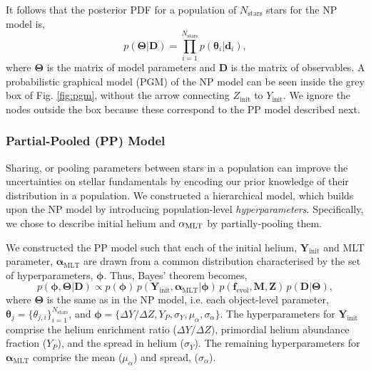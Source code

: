 It follows that the posterior PDF for a population of $N_\mathrm{stars}$ stars for the NP model is, 
%
\begin{equation}
    p(\boldsymbol{\Theta} | \boldsymbol{D}) = \prod_{i=1}^{N_{\mathrm{stars}}} p(\boldsymbol{\theta}_i | \boldsymbol{d}_i),   
\end{equation}
%
where $\boldsymbol{\Theta}$ is the matrix of model parameters and $\boldsymbol{D}$ is the matrix of observables. A probabilistic graphical model (PGM) of the NP model can be seen inside the grey box of Fig. \ref{fig:pgm}, without the arrow connecting $Z_\mathrm{init}$ to $Y_\mathrm{init}$. We ignore the nodes outside the box because these correspond to the PP model described next.

\subsubsection{Partial-Pooled (PP) Model}\label{sec:pp}



Sharing, or pooling parameters between stars in a population can improve the uncertainties on stellar fundamentals by encoding our prior knowledge of their distribution in a population. We constructed a hierarchical model, which builds upon the NP model by introducing population-level \emph{hyperparameters}. Specifically, we chose to describe initial helium and ${\alpha_\mathrm{MLT}}$ by partially-pooling them.

We constructed the PP model such that each of the initial helium, $\boldsymbol{Y}_\mathrm{init}$ and MLT parameter, $\boldsymbol{\alpha}_\mathrm{MLT}$ are drawn from a common distribution characterised by the set of hyperparameters, $\boldsymbol{\phi}$. Thus, Bayes' theorem becomes,
%
\begin{equation}
    p(\boldsymbol{\phi}, \boldsymbol{\Theta} | \boldsymbol{D}) \propto p(\boldsymbol{\phi}) \, p(\boldsymbol{Y}_\mathrm{init}, \boldsymbol{\alpha}_\mathrm{MLT} | \boldsymbol{\phi}) \, p(\boldsymbol{f}_{\mathrm{evol}}, \boldsymbol{M}, \boldsymbol{Z}) \, p(\boldsymbol{D} | \boldsymbol{\Theta}),
    \label{eq:hbmbayes}
\end{equation}
%
where $\boldsymbol{\Theta}$ is the same as in the NP model, i.e. each object-level parameter, $\boldsymbol{\theta}_j = \{\theta_{j, i}\}_{i=1}^{N_\mathrm{stars}}$, and $\boldsymbol{\phi} = \{\Delta Y/\Delta Z, Y_P, \sigma_Y, \mu_\alpha, \sigma_\alpha\}$. The hyperparameters for $\boldsymbol{Y}_\mathrm{init}$ comprise the helium enrichment ratio (${\Delta Y}/{\Delta Z}$), primordial helium abundance fraction ($Y_P$), and the spread in helium ($\sigma_Y$). The remaining hyperparameters for $\boldsymbol{\alpha}_\mathrm{MLT}$ comprise the mean ($\mu_\alpha$) and spread, ($\sigma_\alpha$).

